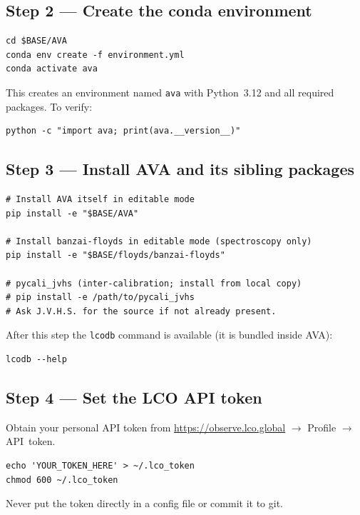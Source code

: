 \documentclass[12pt,a4paper]{article}
\begin{document}
\subsection{Step 2 --- Create the conda environment}

\begin{lstlisting}[style=shell]
cd $BASE/AVA
conda env create -f environment.yml
conda activate ava
\end{lstlisting}

This creates an environment named \texttt{ava} with Python~3.12 and all
required packages.  To verify:
\begin{lstlisting}[style=shell]
python -c "import ava; print(ava.__version__)"
\end{lstlisting}

\subsection{Step 3 --- Install AVA and its sibling packages}

\begin{lstlisting}[style=shell]
# Install AVA itself in editable mode
pip install -e "$BASE/AVA"

# Install banzai-floyds in editable mode (spectroscopy only)
pip install -e "$BASE/floyds/banzai-floyds"

# pycali_jvhs (inter-calibration; install from local copy)
# pip install -e /path/to/pycali_jvhs
# Ask J.V.H.S. for the source if not already present.
\end{lstlisting}

After this step the \texttt{lcodb} command is available (it is bundled inside
AVA):
\begin{lstlisting}[style=shell]
lcodb --help
\end{lstlisting}

\subsection{Step 4 --- Set the LCO API token}

Obtain your personal API token from
\url{https://observe.lco.global} $\to$ Profile $\to$ API~token.

\begin{lstlisting}[style=shell]
echo 'YOUR_TOKEN_HERE' > ~/.lco_token
chmod 600 ~/.lco_token
\end{lstlisting}

\begin{warnbox}
Never put the token directly in a config file or commit it to git.
\end{warnbox}
\end{document}
